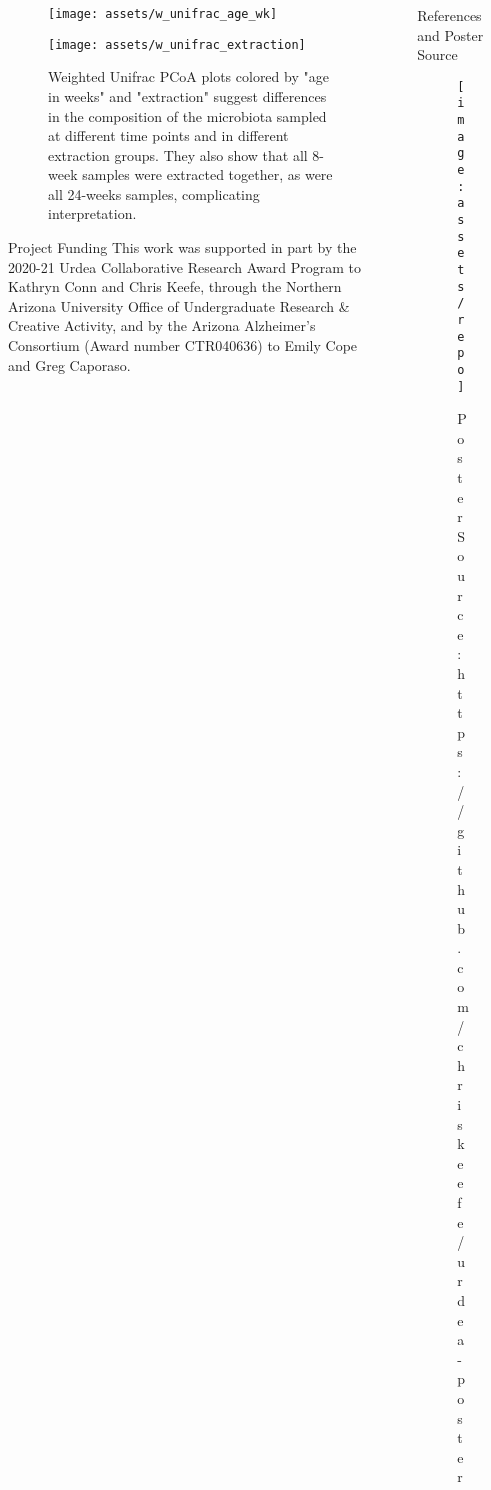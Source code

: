 \documentclass[final]{beamer}
\newlength{\sepwidth}
\newlength{\colwidth}
\newcommand{\separatorcolumn}{\begin{column}{\sepwidth}\end{column}}
\begin{document}
\begin{frame}[t]
\begin{columns}[t]
\begin{column}{\colwidth}
  \begin{figure}[!htb]
        \begin{center}
          \texttt{[image: assets/w\_unifrac\_age\_wk]}
        \end{center}
      \endminipage
        \begin{center}
          \texttt{[image: assets/w\_unifrac\_extraction]}
        \end{center}
      \endminipage\hfill
      \caption{Weighted Unifrac PCoA plots colored by "age in weeks" and
      "extraction" suggest differences in the composition of the microbiota
      sampled at different time points and in different extraction groups.
      They also show that all 8-week samples were extracted together, as were
      all 24-weeks samples, complicating interpretation.}
      \label{fig:qpcrResults}
    \end{figure}

  \begin{block}{Project Funding}
    This work was supported in part by the 2020-21 Urdea Collaborative
    Research Award Program to Kathryn Conn and Chris Keefe, through the
    Northern Arizona University Office of Undergraduate Research \& Creative
    Activity, and by the Arizona Alzheimer’s Consortium (Award number
    CTR040636) to Emily Cope and Greg Caporaso.
  \end{block}

\end{column}

\separatorcolumn

\begin{column}{\colwidth}

  \begin{block}{References and Poster Source}
    \nocite{*}
    
    
    \begin{figure}
      \begin{minipage}[c]{\textwidth}
        \hfill
        \texttt{[image: assets/repo]}
      \end{minipage}
      \begin{minipage}[c]{\textwidth}
        \hfill
        Poster Source: https://github.com/chriskeefe/urdea-poster
      \end{minipage}
    \end{figure}
    
  \end{block}

\end{column}

\separatorcolumn
\end{columns}
\end{frame}
\end{document}

